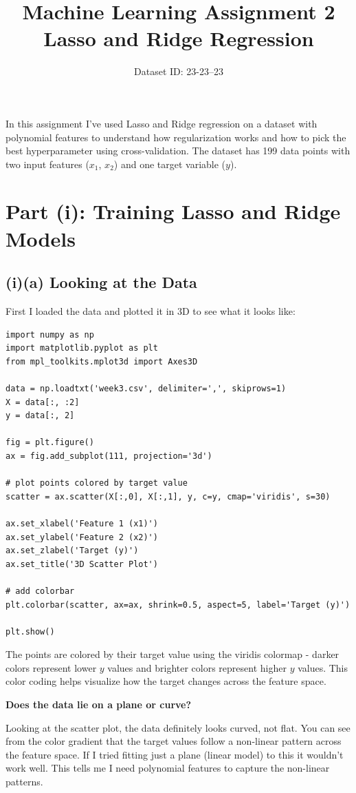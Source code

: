 \documentclass[11pt,a4paper]{article}
\title{Machine Learning Assignment 2\\Lasso and Ridge Regression}
\author{Dataset ID: 23-23--23}
\date{}
\begin{document}
\maketitle

In this assignment I've used Lasso and Ridge regression on a dataset with polynomial features to understand how regularization works and how to pick the best hyperparameter using cross-validation. The dataset has 199 data points with two input features ($x_1$, $x_2$) and one target variable ($y$).

\section*{Part (i): Training Lasso and Ridge Models}

\subsection*{(i)(a) Looking at the Data}

First I loaded the data and plotted it in 3D to see what it looks like:

\begin{lstlisting}
import numpy as np
import matplotlib.pyplot as plt
from mpl_toolkits.mplot3d import Axes3D

data = np.loadtxt('week3.csv', delimiter=',', skiprows=1)
X = data[:, :2]
y = data[:, 2]

fig = plt.figure()
ax = fig.add_subplot(111, projection='3d')

# plot points colored by target value
scatter = ax.scatter(X[:,0], X[:,1], y, c=y, cmap='viridis', s=30)

ax.set_xlabel('Feature 1 (x1)')
ax.set_ylabel('Feature 2 (x2)')
ax.set_zlabel('Target (y)')
ax.set_title('3D Scatter Plot')

# add colorbar
plt.colorbar(scatter, ax=ax, shrink=0.5, aspect=5, label='Target (y)')

plt.show()
\end{lstlisting}

The points are colored by their target value using the viridis colormap - darker colors represent lower $y$ values and brighter colors represent higher $y$ values. This color coding helps visualize how the target changes across the feature space.

\textbf{Does the data lie on a plane or curve?}

Looking at the scatter plot, the data definitely looks curved, not flat. You can see from the color gradient that the target values follow a non-linear pattern across the feature space. If I tried fitting just a plane (linear model) to this it wouldn't work well. This tells me I need polynomial features to capture the non-linear patterns.
\end{document}
